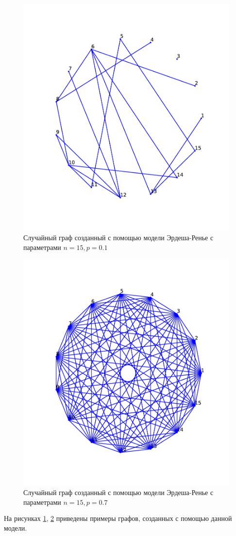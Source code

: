 \begin{figure}[H] 
    \includegraphics[scale=0.5]{erd1.pdf} 
    \caption{Случайный граф созданный с помощью модели Эрдеша-Ренье с
    параметрами $n = 15, p = 0.1$}
    \label{erd_3}
\end{figure} 
\begin{figure}[H] 
    \includegraphics[scale=0.5]{erd2.pdf}
    \caption{Случайный граф созданный с помощью модели Эрдеша-Ренье с
    параметрами $n = 15, p = 0.7$}
    \label{erd_4}
\end{figure} 
На рисунках \ref{erd_3}, \ref{erd_4}
приведены примеры графов, созданных с помощью
данной модели. 


